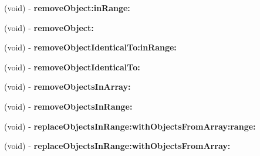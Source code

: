 \begin{DoxyCompactItemize}
\item 
\hypertarget{interfaceget_prescriptions_for_patient_response_a6f2f8e298bcdf5dbc41d8843526b6672}{}(void) -\/ {\bfseries remove\+Object\+:in\+Range\+:}\label{interfaceget_prescriptions_for_patient_response_a6f2f8e298bcdf5dbc41d8843526b6672}

\item 
\hypertarget{interfaceget_prescriptions_for_patient_response_a380fbb870767058c8ca42ec2c12dc5a8}{}(void) -\/ {\bfseries remove\+Object\+:}\label{interfaceget_prescriptions_for_patient_response_a380fbb870767058c8ca42ec2c12dc5a8}

\item 
\hypertarget{interfaceget_prescriptions_for_patient_response_a77f993699c10d85f698b5bf46369b20f}{}(void) -\/ {\bfseries remove\+Object\+Identical\+To\+:in\+Range\+:}\label{interfaceget_prescriptions_for_patient_response_a77f993699c10d85f698b5bf46369b20f}

\item 
\hypertarget{interfaceget_prescriptions_for_patient_response_a601142540c20abc0783661d9932e9610}{}(void) -\/ {\bfseries remove\+Object\+Identical\+To\+:}\label{interfaceget_prescriptions_for_patient_response_a601142540c20abc0783661d9932e9610}

\item 
\hypertarget{interfaceget_prescriptions_for_patient_response_ad0aa6deb222e5ef6d67dd5be27b046d4}{}(void) -\/ {\bfseries remove\+Objects\+In\+Array\+:}\label{interfaceget_prescriptions_for_patient_response_ad0aa6deb222e5ef6d67dd5be27b046d4}

\item 
\hypertarget{interfaceget_prescriptions_for_patient_response_a14f0a429e5113e2bc1d23e33b8b5a9da}{}(void) -\/ {\bfseries remove\+Objects\+In\+Range\+:}\label{interfaceget_prescriptions_for_patient_response_a14f0a429e5113e2bc1d23e33b8b5a9da}

\item 
\hypertarget{interfaceget_prescriptions_for_patient_response_a412770f1787d350a13925b62e2b12a56}{}(void) -\/ {\bfseries replace\+Objects\+In\+Range\+:with\+Objects\+From\+Array\+:range\+:}\label{interfaceget_prescriptions_for_patient_response_a412770f1787d350a13925b62e2b12a56}

\item 
\hypertarget{interfaceget_prescriptions_for_patient_response_adb59a778aea5a74f1c514b82de9dd6de}{}(void) -\/ {\bfseries replace\+Objects\+In\+Range\+:with\+Objects\+From\+Array\+:}\label{interfaceget_prescriptions_for_patient_response_adb59a778aea5a74f1c514b82de9dd6de}


\end{DoxyCompactItemize}
